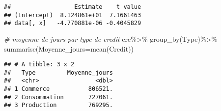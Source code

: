 \documentclass[
]{article}
\newenvironment{Shaded}{\begin{snugshade}}{\end{snugshade}}
\newcommand{\AttributeTok}[1]{\textcolor[rgb]{0.77,0.63,0.00}{#1}}
\newcommand{\CommentTok}[1]{\textcolor[rgb]{0.56,0.35,0.01}{\textit{#1}}}
\newcommand{\ControlFlowTok}[1]{\textcolor[rgb]{0.13,0.29,0.53}{\textbf{#1}}}
\newcommand{\DecValTok}[1]{\textcolor[rgb]{0.00,0.00,0.81}{#1}}
\newcommand{\DocumentationTok}[1]{\textcolor[rgb]{0.56,0.35,0.01}{\textbf{\textit{#1}}}}
\newcommand{\FunctionTok}[1]{\textcolor[rgb]{0.00,0.00,0.00}{#1}}
\newcommand{\NormalTok}[1]{#1}
\newcommand{\OtherTok}[1]{\textcolor[rgb]{0.56,0.35,0.01}{#1}}
\newcommand{\SpecialCharTok}[1]{\textcolor[rgb]{0.00,0.00,0.00}{#1}}
\newcommand{\StringTok}[1]{\textcolor[rgb]{0.31,0.60,0.02}{#1}}
\begin{document}
\begin{Shaded}
\end{Shaded}

\begin{verbatim}
##                  Estimate    t value
## (Intercept)  8.124861e+01  7.1661463
## data[, x]   -4.770881e-06 -0.4045829
\end{verbatim}

\begin{Shaded}
\begin{Highlighting}[]
\CommentTok{\# moyenne de jours par type de credit}
\NormalTok{cre}\SpecialCharTok{\%\textgreater{}\%}
  \FunctionTok{group\_by}\NormalTok{(Type)}\SpecialCharTok{\%\textgreater{}\%}
  \FunctionTok{summarise}\NormalTok{(}\AttributeTok{Moyenne\_jours=}\FunctionTok{mean}\NormalTok{(Credit))}
\end{Highlighting}
\end{Shaded}

\begin{verbatim}
## # A tibble: 3 x 2
##   Type         Moyenne_jours
##   <chr>                <dbl>
## 1 Commerce           806521.
## 2 Consommation       727061.
## 3 Production         769295.
\end{verbatim}
\end{document}
